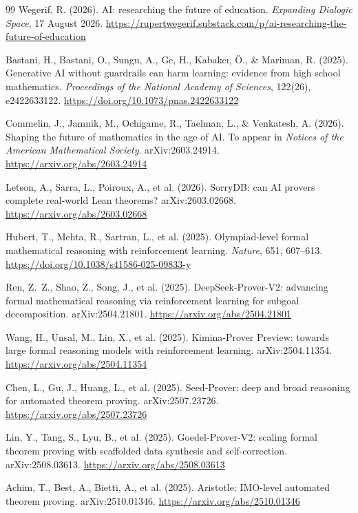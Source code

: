 \documentclass[11pt]{article}
\begin{document}
\begin{thebibliography}{99}
 Wegerif, R. (2026). AI: researching the future of
education. \emph{Expanding Dialogic Space}, 17 August 2026.
\url{https://rupertwegerif.substack.com/p/ai-researching-the-future-of-education}

 Bastani, H., Bastani, O., Sungu, A., Ge, H., Kabakc\i,
\"O., \& Mariman, R. (2025). Generative AI without guardrails can harm learning:
evidence from high school mathematics. \emph{Proceedings of the National
Academy of Sciences}, 122(26), e2422633122.
\url{https://doi.org/10.1073/pnas.2422633122}

 Commelin, J., Jamnik, M., Ochigame, R., Taelman, L., \&
Venkatesh, A. (2026). Shaping the future of mathematics in the age of AI. To
appear in \emph{Notices of the American Mathematical Society}. arXiv:2603.24914.
\url{https://arxiv.org/abs/2603.24914}

 Letson, A., Sarra, L., Poiroux, A., et al. (2026). SorryDB:
can AI provers complete real-world Lean theorems? arXiv:2603.02668.
\url{https://arxiv.org/abs/2603.02668}

 Hubert, T., Mehta, R., Sartran, L., et al. (2025).
Olympiad-level formal mathematical reasoning with reinforcement learning.
\emph{Nature}, 651, 607--613. \url{https://doi.org/10.1038/s41586-025-09833-y}

 Ren, Z.~Z., Shao, Z., Song, J., et al. (2025).
DeepSeek-Prover-V2: advancing formal mathematical reasoning via reinforcement
learning for subgoal decomposition. arXiv:2504.21801.
\url{https://arxiv.org/abs/2504.21801}

 Wang, H., Unsal, M., Lin, X., et al. (2025).
Kimina-Prover Preview: towards large formal reasoning models with reinforcement
learning. arXiv:2504.11354. \url{https://arxiv.org/abs/2504.11354}

 Chen, L., Gu, J., Huang, L., et al. (2025). Seed-Prover:
deep and broad reasoning for automated theorem proving. arXiv:2507.23726.
\url{https://arxiv.org/abs/2507.23726}

 Lin, Y., Tang, S., Lyu, B., et al. (2025).
Goedel-Prover-V2: scaling formal theorem proving with scaffolded data synthesis
and self-correction. arXiv:2508.03613. \url{https://arxiv.org/abs/2508.03613}

 Achim, T., Best, A., Bietti, A., et al. (2025).
Aristotle: IMO-level automated theorem proving. arXiv:2510.01346.
\url{https://arxiv.org/abs/2510.01346}


\end{thebibliography}
\end{document}
